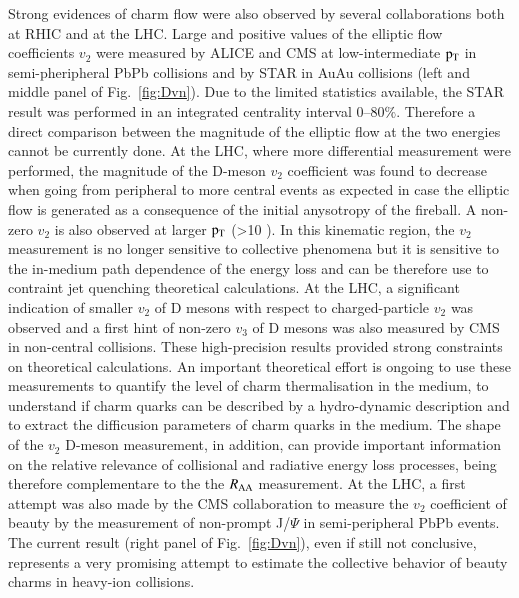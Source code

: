 \documentclass{webofc}
\begin{document}
Strong evidences of charm flow were also observed by several collaborations both at RHIC and at the LHC. Large and positive values of the elliptic flow coefficients $v_{2}$ were measured by ALICE 
and CMS at low-intermediate $\rm p_{\rm T} $ in semi-pheripheral PbPb collisions and by STAR in AuAu collisions (left and middle panel of Fig.~\ref{fig:Dvn}). 
Due to the limited statistics available, the STAR result was performed in an integrated 
centrality interval 0--80$\%$. Therefore a direct comparison between the magnitude of the elliptic flow at the two energies cannot be currently done.
At the LHC, where more differential measurement were performed, the magnitude of the D-meson $v_{2}$ coefficient was found to decrease when going from peripheral to more central events as expected 
in case the elliptic flow is generated as a consequence of the initial anysotropy of the fireball.  A non-zero $v_{2}$ is also observed at larger $\rm p_{\rm T} $ (>10 \GeVc). In this kinematic region, the $v_{2}$ measurement is no
longer sensitive to collective phenomena but it is sensitive to the in-medium path dependence of the energy loss and can be therefore use to contraint jet quenching theoretical calculations. At the LHC, a significant indication 
of smaller $v_{2}$ of D mesons with respect to charged-particle $v_{2}$ was observed and a first hint of non-zero $v_{3}$ of D mesons was also measured by CMS in non-central collisions. 
These high-precision results provided strong constraints on theoretical calculations. An important theoretical effort is ongoing to use these measurements to quantify the level of charm thermalisation in the medium, 
to understand if charm quarks can be described by a hydro-dynamic description and to extract the difficusion parameters of charm quarks in the medium. The shape of the $v_{2}$ D-meson measurement, in addition, 
can provide important information on the relative relevance of collisional and radiative energy loss processes, being therefore complementare to the the $R_{\mathrm{AA}}$ measurement. 
At the LHC, a first attempt was also made by the CMS collaboration to measure the $v_{2}$  coefficient of beauty by the measurement of non-prompt J/$\Psi$ in semi-peripheral PbPb events. 
The current result (right panel of Fig.~\ref{fig:Dvn}), even if still not conclusive, represents a very promising attempt to estimate the collective behavior of beauty charms in heavy-ion collisions. 
\end{document}
